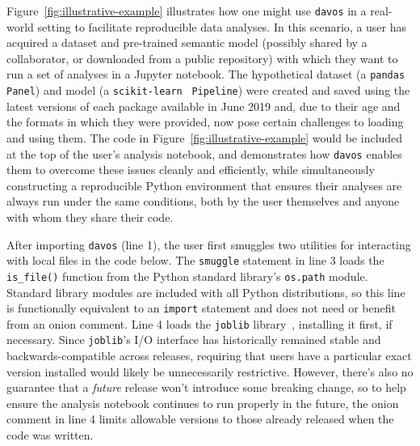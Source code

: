 \documentclass[preprint,12pt,a4paper]{elsarticle}
\begin{document}
Figure~\ref{fig:illustrative-example} illustrates how one might use \texttt{davos} in a real-world setting to facilitate reproducible data analyses. In this scenario, a user has acquired a dataset and pre-trained semantic model (possibly shared by a collaborator, or downloaded from a public repository) with which they want to run a set of analyses in a Jupyter notebook. The hypothetical dataset (a \texttt{pandas}~\cite{McKi10} \texttt{Panel}) and model (a \texttt{scikit-learn}~\cite{PedrEtal11} \texttt{Pipeline}) were created and saved using the latest versions of each package available in June 2019 and, due to their age and the formats in which they were provided, now pose certain challenges to loading and using them. The code in Figure~\ref{fig:illustrative-example} would be included at the top of the user's analysis notebook, and demonstrates how \texttt{davos} enables them to overcome these issues cleanly and efficiently, while simultaneously constructing a reproducible Python environment that ensures their analyses are always run under the same conditions, both by the user themselves and anyone with whom they share their code.

After importing \texttt{davos} (line 1), the user first smuggles two utilities for interacting with local files in the code below. The \texttt{smuggle} statement in line 3 loads the \texttt{is\_file()} function from the Python standard library's \texttt{os.path} module. Standard library modules are included with all Python distributions, so this line is functionally equivalent to an \texttt{import} statement and does not need or benefit from an onion comment. Line 4 loads the \texttt{joblib} library~\cite{Varo10}, installing it first, if necessary. Since \texttt{joblib}'s I/O interface has historically remained stable and backwards-compatible across releases, requiring that users have a particular exact version installed would likely be unnecessarily restrictive. However, there's also no guarantee that a \textit{future} release won't introduce some breaking change, so to help ensure the analysis notebook continues to run properly in the future, the onion comment in line 4 limits allowable versions to those already released when the code was written.
\end{document}
